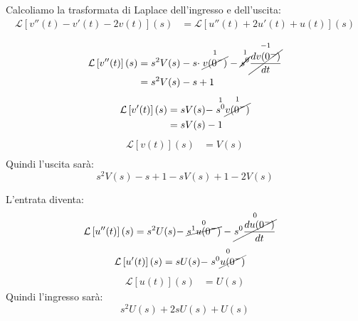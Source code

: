 \documentclass[a4paper]{article}
\begin{document}
\begin{example}
\begin{enumerate}
\begin{enumerate}
          \vspace{1em}
          \noindent
          Calcoliamo la trasformata di Laplace dell'ingresso e dell'uscita:
          \[
            \begin{aligned}
              \mathcal{L}\left[ v''(t) - v'(t) -2v(t) \right](s) &= \mathcal{L}\left[ u''(t) + 2u'(t) + u(t) \right](s)\\
            \end{aligned}
          \]
          \[
          \begin{aligned}
            \mathcal{L}\left[ v''(t) \right](s) &= s^2 V(s) - s \cdot \stackrel{1}{\cancel{v(0^-)}}
            - \stackrel{1}{\cancel{s^0}} \stackrel{-1}{\cancel{\frac{dv(0^-)}{dt}}}\\
                                                &= s^2 V(s) - s + 1
          \end{aligned}
          \] 
          \[
          \begin{aligned}
            \mathcal{L}\left[ v'(t) \right](s) &= s V(s) - \stackrel{1}{s^0} \stackrel{1}{\cancel{v(0^-)}}\\
                                                &= s V(s) - 1
          \end{aligned}
          \] 
          \[
          \begin{aligned}
            \mathcal{L}\left[ v(t) \right](s) &= V(s)\\
          \end{aligned}
          \] 
          Quindi l'uscita sarà:
          \[
            s^2 V(s) - s + 1 - s V(s) + 1 - 2V(s)
          \] 

          \vspace{1em}
          \noindent
          L'entrata diventa:
          \[
            \begin{aligned}
              \mathcal{L}\left[ u''(t) \right](s) &= s^2 U(s) - \stackrel{0}{\cancel{s^1 u(0^-)}}
              - \stackrel{0}{\cancel{s^0 \frac{du(0^-)}{dt}}}
            \end{aligned}
          \] 
          \[
            \begin{aligned}
              \mathcal{L}\left[ u'(t) \right](s) &= s U(s) - \stackrel{0}{s^0 \cancel{u(0^-)}}
            \end{aligned}
          \] 
          \[
            \begin{aligned}
              \mathcal{L}\left[ u(t) \right](s) &= U(s)
            \end{aligned}
          \]
          Quindi l'ingresso sarà:
          \[
            s^2 U(s) + 2s U(s) + U(s)
          \]


\end{enumerate}
\end{enumerate}
\end{example}
\end{document}
